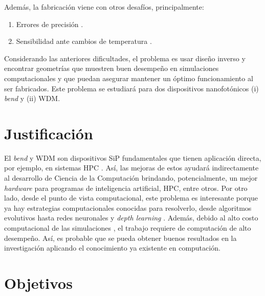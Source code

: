 Además, la fabricación viene con otros desafíos, principalmente:

\begin{enumerate}
  \item Errores de precisión \citep{Piggott2017}.
  \item Sensibilidad ante cambios de temperatura \citep{Vuckovic2019}.
\end{enumerate}

Considerando las anteriores dificultades, el problema es usar diseño inverso y encontrar geometrías que muestren buen desempeño en simulaciones computacionales y que puedan asegurar mantener un óptimo funcionamiento al ser fabricados. 
Este problema se estudiará para dos dispositivos nanofotónicos (i) \emph{bend} y (ii) WDM.

\section{Justificación}

El \emph{bend} y WDM son dispositivos SiP fundamentales que tienen aplicación
directa, por ejemplo, en sistemas HPC \citep{Shen2017}.
Así, las mejoras de estos ayudará indirectamente al desarrollo de Ciencia
de la Computación brindando, potencialmente, un mejor \emph{hardware} para programas de
inteligencia artificial, HPC, entre otros.
Por otro lado, desde el punto de vista computacional, este problema es interesante porque ya hay estrategias computacionales conocidas para resolverlo, desde algoritmos evolutivos \citep{Hansen2016} hasta redes neuronales \citep{Goodfellow2015} y \emph{depth learning} \citep{Malkiel2018}. 
Además, debido al alto costo computacional de las simulaciones \citep{Schneider2019}, el trabajo requiere de computación de alto desempeño.
Así, es probable que se pueda obtener buenos resultados en la investigación aplicando el conocimiento ya existente en computación. 

\section{Objetivos}

